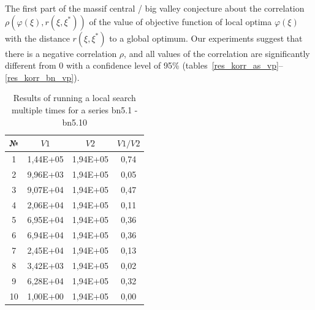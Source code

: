 \documentclass{ifacconf}
\begin{document}
The first part of the massif central / big valley conjecture about the correlation $\rho(\varphi(\xi),r(\xi,\xi^*))$ of the value of 
objective function of local optima $\varphi(\xi)$
with the distance $r(\xi,\xi^*)$ to a global optimum. 
Our experiments suggest that there is a negative correlation $\rho$, and all values of the
correlation are significantly different from 0 with a confidence level of 95\% (tables~\ref{res_korr_as_vp}--\ref{res_korr_bn_vp}).
\begin{table}[h!]
	\vspace{1cm}
	\centering
	\begin{tabular}{|c|c|c|c|}
		\hline
		\hspace*{0.1cm}№\hspace*{0.1cm} &
		\hspace*{0.1cm}$V1$\hspace*{0.1cm}&
		\hspace*{0.1cm}$V2$\hspace*{0.1cm}&
		\hspace*{0.1cm}$V1/V2$\hspace*{0.1cm}\\
		\hline
		1 &  1,44E+05  &  1,94E+05  &  0,74\\
		2 &  9,96E+03  &  1,94E+05  &  0,05\\
		3 &  9,07E+04  &  1,94E+05  &  0,47\\
		4 &  2,06E+04  &  1,94E+05  &  0,11\\
		5 &  6,95E+04  &  1,94E+05  &  0,36\\
		6 &  6,94E+04  &  1,94E+05  &  0,36\\
		7 &  2,45E+04  &  1,94E+05  &  0,13\\
		8 &  3,42E+03  &  1,94E+05  &  0,02\\
		9 &  6,28E+04  &  1,94E+05  &  0,32\\
		10&  1,00E+00  &  1,94E+05  &  0,00\\
		\hline
	\end{tabular}
	\vspace{1em}
	\caption{Results of running a local search multiple times for a series bn5.1 - bn5.10}	\label{spher_bn}
\end{table}
\end{document}
